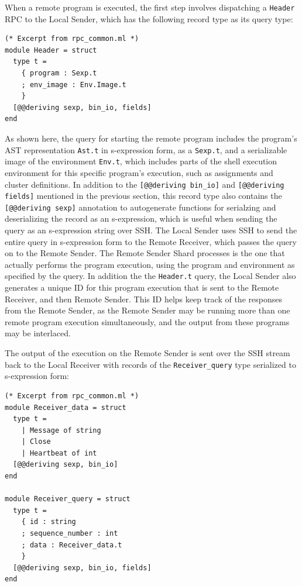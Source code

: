 \documentclass[twoside]{report}
\begin{document}
When a remote program is executed, the first step involves dispatching a \texttt{Header} RPC to the Local Sender, which has the following record type as its query type:
\begin{lstlisting}
(* Excerpt from rpc_common.ml *)
module Header = struct
  type t =
    { program : Sexp.t
    ; env_image : Env.Image.t
    }
  [@@deriving sexp, bin_io, fields]
end
\end{lstlisting}
As shown here, the query for starting the remote program includes the program's AST representation \texttt{Ast.t} in s-expression form, as a \texttt{Sexp.t}, and a serializable image of the environment \texttt{Env.t}, which includes parts of the shell execution environment for this specific program's execution, such as assignments and cluster definitions.
In addition to the \texttt{[@@deriving bin\_io]} and \texttt{[@@deriving fields]} mentioned in the previous section, this record type also contains the \texttt{[@@deriving sexp]} annotation to autogenerate functions for serialzing and deserializing the record as an s-expression, which is useful when sending the query as an s-expression string over SSH.
The Local Sender uses SSH to send the entire query in s-expression form to the Remote Receiver, which passes the query on to the Remote Sender.
The Remote Sender Shard processes is the one that actually performs the program execution, using the program and environment as specified by the query.
In addition the the \texttt{Header.t} query, the Local Sender also generates a unique ID for this program execution that is sent to the Remote Receiver, and then Remote Sender.
This ID helps keep track of the responses from the Remote Sender, as the Remote Sender may be running more than one remote program execution simultaneously, and the output from these programs may be interlaced.

The output of the execution on the Remote Sender is sent over the SSH stream back to the Local Receiver with records of the \texttt{Receiver\_query} type serialized to s-expression form:
\begin{lstlisting}
(* Excerpt from rpc_common.ml *)
module Receiver_data = struct
  type t =
    | Message of string
    | Close
    | Heartbeat of int
  [@@deriving sexp, bin_io]
end

module Receiver_query = struct
  type t =
    { id : string
    ; sequence_number : int
    ; data : Receiver_data.t
    }
  [@@deriving sexp, bin_io, fields]
end
\end{lstlisting}
\end{document}
